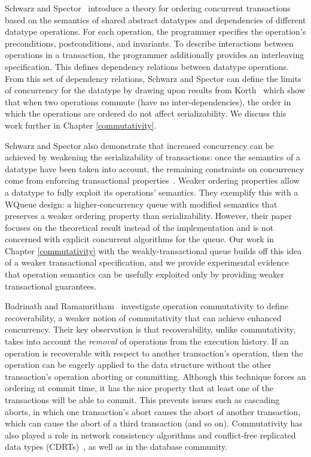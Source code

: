 Schwarz and Spector~\cite{schwarz} introduce a theory for ordering concurrent transactions based on the semantics of shared abstract datatypes and dependencies of different datatype operations. For each operation, the programmer specifies the operation's preconditions, postconditions, and invariants. To describe interactions between operations in a transaction, the programmer additionally provides an interleaving specification. This defines dependency relations between datatype operations. From this set of dependency relations, Schwarz and Spector can define the limits of concurrency for the datatype by drawing upon results from Korth~\cite{korth} which show that when two operations commute (have no inter-dependencies), the order in which the operations are ordered do not affect serializability. We discuss this work further in Chapter \ref{commutativity}. 

Schwarz and Spector also demonstrate that increased concurrency can be achieved by weakening the serializability of transactions: once the semantics of a datatype have been taken into account, the remaining constraints on concurrency come from enforcing transactional properties~\cite{kung}. Weaker ordering properties allow a datatype to fully exploit its operations' semantics. They exemplify this with a WQueue design: a higher-concurrency queue with modified semantics that preserves a weaker ordering property than serializability. However, their paper focuses on the theoretical result instead of the implementation and is not concerned with explicit concurrent algorithms for the queue. Our work in Chapter \ref{commutativity} with the weakly-transactional queue builds off this idea of a weaker transactional specification, and we provide experimental evidence that operation semantics can be usefully exploited only by providing weaker transactional guarantees.

Badrinath and Ramamritham~\cite{badrinath} investigate operation commutativity to define recoverability, a weaker notion of commutativity that can achieve enhanced concurrency. Their key observation is that recoverability, unlike commutativity, takes into account the \emph{removal} of operations from the execution history. If an operation is recoverable with respect to another transaction's operation, then the operation can be eagerly applied to the data structure without the other transaction's operation aborting or committing. Although this technique forces an ordering at commit time, it has the nice property that at least one of the transactions will be able to commit. This prevents issues such as cascading aborts, in which one transaction's abort causes the abort of another transaction, which can cause the abort of a third transaction (and so on).
Commutativity has also played a role in network consistency algorithms and conflict-free replicated data types (CDRTs)~\cite{CRDT}, as well as in the database community.

